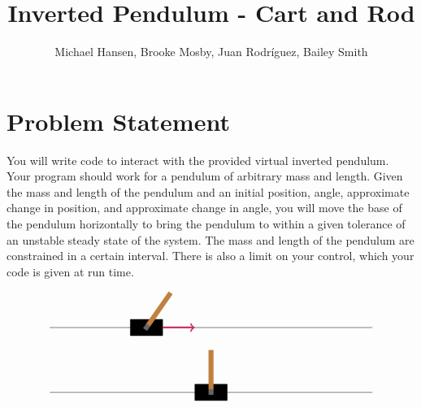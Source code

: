 \documentclass{hitec}
\author{Michael Hansen, Brooke Mosby, Juan Rodr\'iguez, Bailey Smith}
\title{Inverted Pendulum - Cart and Rod}
\begin{document}
	\maketitle
	
	\section{Problem Statement}
	You will write code to interact with the provided virtual inverted pendulum. Your
	program should work for a pendulum of arbitrary mass and length. Given the mass and
	length of the pendulum and an initial position, angle, approximate change in position, and
	approximate change in angle, you will move the base of the pendulum horizontally to bring
	the pendulum to within a given tolerance of an unstable steady state of the system. The
	mass and length of the pendulum are constrained in a certain interval. There is also a limit
	on your control, which your code is given at run time.
	
	\[
	\begin{tikzpicture}
	
	\draw[help lines,thick] (-5,0) -- (5,0);
	\filldraw[black] (-2.5,-.25) -- ++(0,.5) -- ++(1,0) -- ++(0,-.5) -- cycle;
	\begin{scope}[xshift=-2cm,rotate=-35]
	\filldraw[black!60] (-.07,-.07) -- ++(0,.17) -- ++(.14,0) -- ++(0,-.17) -- cycle;
	\filldraw[brown] (-.07,.1) -- ++(0,1.2) -- ++(.14,0) -- ++(0,-1.2) -- cycle;
	\end{scope}
	\draw[ultra thick,->,purple!80] (-1.5,0) -- ++(1,0);
	
	\begin{scope}[yshift=-2cm]
	\draw[help lines,thick] (-5,0) -- (5,0);
	\filldraw[black] (-.5,-.25) -- ++(0,.5) -- ++(1,0) -- ++(0,-.5) -- cycle;
	\filldraw[black!60] (-.07,-.07) -- ++(0,.17) -- ++(.14,0) -- ++(0,-.17) -- cycle;
	\filldraw[brown] (-.07,.1) -- ++(0,1.2) -- ++(.14,0) -- ++(0,-1.2) -- cycle;
	
	\end{scope}
	\end{tikzpicture}
	\]
	
	
\end{document}
